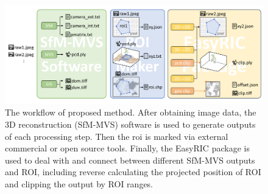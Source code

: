 \documentclass{configs/bmcart}
\begin{document}
\begin{backmatter}




\begin{figure}[!htb]
  \includegraphics[width=0.95\linewidth]{figures/workflow.pdf}
  \caption{The workflow of proposed method. After obtaining image data, the 3D reconstruction (SfM-MVS) software is used to generate outputs of each processing step. Then the \acrfull*{roi} is marked via external commercial or open source tools. Finally, the EasyRIC package is used to deal with and connect between different SfM-MVS outputs and ROI, including reverse calculating the projected position of ROI and clipping the output by ROI ranges.}
  \label{fig:workflow}
\end{figure}


\end{backmatter}
\end{document}
